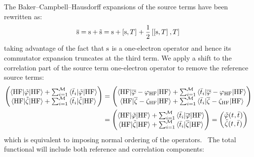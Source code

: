 The Baker--Campbell--Hausdorff expansions of the source terms have been
rewritten as:
\begin{equation}
  \overline{\mathrm{s}} = \mathrm{s} + \tilde{\mathrm{s}} = \mathrm{s} + \left[ \mathrm{s}, T \right]^{}
  + \frac{1}{2}\left[ \left[ \mathrm{s}, T \right]^{}, T \right]^{}
\end{equation}
taking advantage of the fact that $\mathrm{s}$ is a one-electron operator and
hence its commutator expansion truncates at the third term.
We apply a shift to the correlation part of the source term
one-electron operator to remove the reference source terms:
\begin{equation}
  \begin{aligned}
  \begin{pmatrix}
   \braket{\mathrm{HF} | \tilde{\varphi} | \mathrm{HF}}
  + \sum_{i=1}^{\mathcal{M}}\braket{\bar{t}_{i} | \tilde{\varphi} | \mathrm{HF}} \\
   \braket{\mathrm{HF} | \tilde{\zeta} | \mathrm{HF}}
  + \sum_{i=1}^{\mathcal{M}}\braket{\bar{t}_{i} | \tilde{\zeta} | \mathrm{HF}}
  \end{pmatrix}
  &=
  \begin{pmatrix}
    \braket{\mathrm{HF} | \overline{\varphi} - \varphi_\mathrm{HF} | \mathrm{HF}}
  + \sum_{i=1}^{\mathcal{M}}\braket{\bar{t}_{i} | \overline{\varphi} - \varphi_\mathrm{HF} | \mathrm{HF}} \\
  \braket{\mathrm{HF} | \overline{\zeta} - \zeta_\mathrm{HF} | \mathrm{HF}}
  + \sum_{i=1}^{\mathcal{M}}\braket{\bar{t}_{i} | \overline{\zeta} -
  \zeta_\mathrm{HF}| \mathrm{HF}}
  \end{pmatrix}
  \\
  &=
  \begin{pmatrix}
   \braket{\mathrm{HF} | \tilde{\varphi} | \mathrm{HF}}
  + \sum_{i=1}^{\mathcal{M}}\braket{\bar{t}_{i} | \overline{\varphi} | \mathrm{HF}} \\
   \braket{\mathrm{HF} | \tilde{\zeta} | \mathrm{HF}}
  + \sum_{i=1}^{\mathcal{M}}\braket{\bar{t}_{i} | \overline{\zeta} | \mathrm{HF}}
  \end{pmatrix}
  =
  \begin{pmatrix}
    \tilde{\varphi}(t_{}, \bar{t}_{}) \\
    \tilde{\zeta}(t_{}, \bar{t}_{})
  \end{pmatrix}
\end{aligned}
\end{equation}
which is equivalent to imposing normal ordering of the
operators.~\autocite{Shavitt}
The total functional will include both reference and correlation
components:
